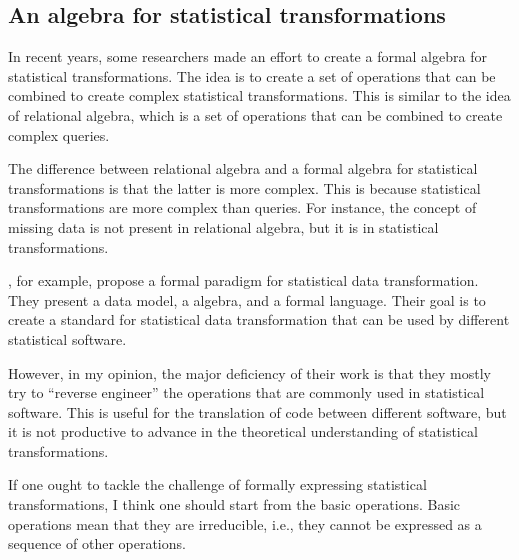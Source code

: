 \subsection{An algebra for statistical transformations}

In recent years, some researchers made an effort to create a formal algebra for
statistical transformations.  The idea is to create a set of operations that can be
combined to create complex statistical transformations.  This is similar to the idea of
relational algebra, which is a set of operations that can be combined to create complex
queries.

The difference between relational algebra and a formal algebra for statistical
transformations is that the latter is more complex.  This is because statistical
transformations are more complex than queries.  For instance, the concept of missing data
is not present in relational algebra, but it is in statistical transformations.

\textcite{Song2021}, for example, propose a formal paradigm for statistical data
transformation.  They present a data model, a algebra, and a formal language.  Their goal
is to create a standard for statistical data transformation that can be used by different
statistical software.

However, in my opinion, the major deficiency of their work is that they mostly try to
``reverse engineer'' the operations that are commonly used in statistical software.  This
is useful for the translation of code between different software, but it is not productive
to advance in the theoretical understanding of statistical transformations.

If one ought to tackle the challenge of formally expressing statistical transformations, I
think one should start from the basic operations.  Basic operations mean that they are
irreducible, i.e., they cannot be expressed as a sequence of other operations.

